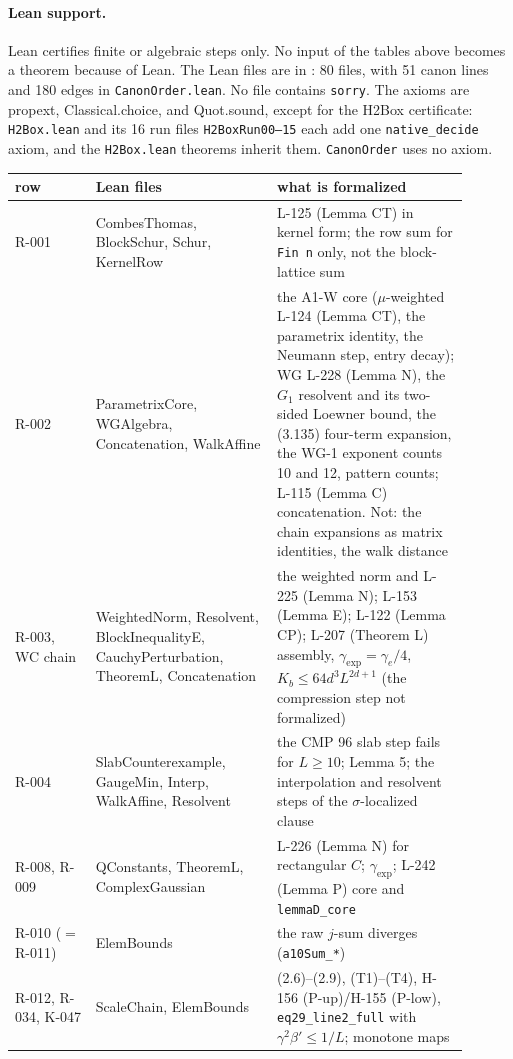 \paragraph{Lean support.} Lean certifies finite or algebraic steps only. No input of the tables above becomes a theorem because of Lean. The Lean files are in : 80 files, with 51 canon lines and 180 edges in \texttt{CanonOrder.lean}. No file contains \texttt{sorry}. The axioms are propext, Classical.choice, and Quot.sound, except for the H2Box certificate: \texttt{H2Box.lean} and its 16 run files \texttt{H2BoxRun00--15} each add one \texttt{native\_decide} axiom, and the \texttt{H2Box.lean} theorems inherit them. \texttt{CanonOrder} uses no axiom.
{\small
\begin{longtable}{p{0.16\linewidth}p{0.36\linewidth}p{0.38\linewidth}}
\hline
row & Lean files & what is formalized \\ \hline \endhead
R-001 & CombesThomas, BlockSchur, Schur, KernelRow & L-125 (Lemma CT) in kernel form; the row sum for \texttt{Fin n} only, not the block-lattice sum \\
R-002 & ParametrixCore, WGAlgebra, Concatenation, WalkAffine & the A1-W core ($\mu$-weighted L-124 (Lemma CT), the parametrix identity, the Neumann step, entry decay); WG L-228 (Lemma N), the $G_1$ resolvent and its two-sided Loewner bound, the (3.135) four-term expansion, the WG-1 exponent counts 10 and 12, pattern counts; L-115 (Lemma C) concatenation. Not: the chain expansions as matrix identities, the walk distance \\
R-003, WC chain & WeightedNorm, Resolvent, BlockInequalityE, CauchyPerturbation, TheoremL, Concatenation & the weighted norm and L-225 (Lemma N); L-153 (Lemma E); L-122 (Lemma CP); L-207 (Theorem L) assembly, $\gamma_{\exp}=\gamma_e/4$, $K_b\le64d^3L^{2d+1}$ (the compression step not formalized) \\
R-004 & SlabCounterexample, GaugeMin, Interp, WalkAffine, Resolvent & the CMP 96 slab step fails for $L\ge10$; Lemma 5; the interpolation and resolvent steps of the $\sigma$-localized clause \\
R-008, R-009 & QConstants, TheoremL, ComplexGaussian & L-226 (Lemma N) for rectangular $C$; $\gamma_{\exp}$; L-242 (Lemma P) core and \texttt{lemmaD\_core} \\
R-010 ($=$R-011) & ElemBounds & the raw $j$-sum diverges (\texttt{a10Sum\_*}) \\
R-012, R-034, K-047 & ScaleChain, ElemBounds & (2.6)--(2.9), (T1)--(T4), H-156 (P-up)/H-155 (P-low), \texttt{eq29\_line2\_full} with $\gamma^2\beta'\le1/L$; monotone maps \\

\end{longtable}}

